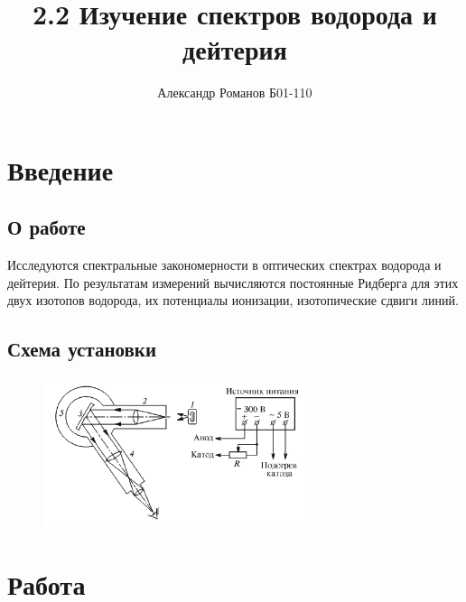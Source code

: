 \documentclass{article}
\author{Александр Романов Б01-110}
\date{}
\title{2.2 Изучение спектров водорода и дейтерия}
\begin{document}
\maketitle
\section{Введение}
\subsection{О работе}
Исследуются спектральные закономерности в оптических спектрах водорода и дейтерия.
По результатам измерений вычисляются постоянные Ридберга для этих двух изотопов
водорода, их потенциалы ионизации, изотопические сдвиги линий.
\subsection{Схема установки}
\begin{figure}[H]
	\centering
	\includegraphics[width=0.7\textwidth]{scheme.png}
\end{figure}
\section{Работа}
\end{document}
